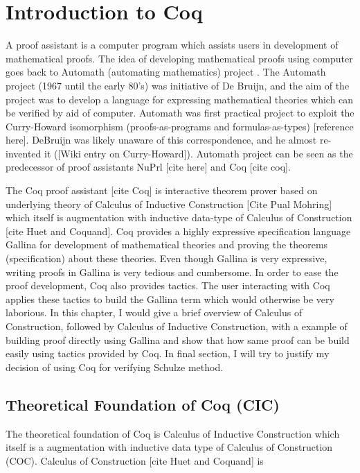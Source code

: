 \chapter{Introduction to Coq}
\label{cha:intro}

A proof assistant is a computer program which assists users in development of mathematical proofs. The idea of 
developing mathematical proofs using computer goes back to Automath (automating mathematics) project
 \citep{Geuvers2009}. The 
Automath project (1967 until the early 80's)  was initiative of De Bruijn, and the aim of the project was to develop
a language for expressing mathematical theories which can be verified by aid of computer.  Automath was first 
practical project to exploit the Curry-Howard isomorphism (proofs-as-programs and formulas-as-types)
 [reference here]. DeBruijn  was likely unaware of this correspondence, and he almost re-invented it 
 ([Wiki entry on Curry-Howard]). Automath project can be seen as the predecessor of
  proof assistants NuPrl [cite here] and Coq [cite coq].   

The Coq proof assistant [cite Coq] is interactive theorem prover based on underlying theory of Calculus of 
Inductive Construction [Cite Pual Mohring]  which itself is augmentation with inductive data-type
 of Calculus of Construction [cite Huet and Coquand].  Coq provides a highly expressive specification 
 language Gallina for development of mathematical theories and proving the theorems (specification) about these
 theories.  Even though Gallina is very expressive, writing proofs  in Gallina is very tedious and cumbersome.  
 In order to ease the proof development, Coq also provides tactics. The user interacting with Coq applies these 
 tactics to build the  Gallina term  which would otherwise be very laborious.  In this chapter, I would give a 
 brief overview of Calculus of Construction, followed by Calculus of Inductive Construction, with a example 
 of building proof directly using Gallina and show that how same proof can be build easily using tactics provided
 by Coq. In final section, I will try to justify my decision of using Coq for verifying Schulze method.
 


\section{Theoretical Foundation of Coq (CIC)}
\label{sec:thesisstatement}
The theoretical foundation of Coq is Calculus of Inductive Construction which itself is a 
augmentation with inductive data type  of Calculus of Construction (COC). Calculus of
Construction [cite Huet and Coquand] is 


